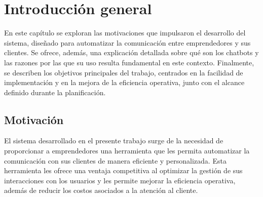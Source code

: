 
\chapter{Introducción general} %

\label{Chapter1} %
\label{IntroGeneral}



\newcommand{\keyword}[1]{\textbf{#1}}
\newcommand{\tabhead}[1]{\textbf{#1}}
\newcommand{\code}[1]{\texttt{#1}}
\newcommand{\file}[1]{\texttt{\bfseries#1}}
\newcommand{\option}[1]{\texttt{\itshape#1}}
\newcommand{\grados}{$^{\circ}$}



En este capítulo se exploran las motivaciones que impulsaron el desarrollo del sistema, diseñado para automatizar la comunicación entre emprendedores y sus clientes. Se ofrece, además, una explicación detallada sobre qué son los chatbots y las razones por las que su uso resulta fundamental en este contexto. Finalmente, se describen los objetivos principales del trabajo, centrados en la facilidad de implementación y en la mejora de la eficiencia operativa, junto con el alcance definido durante la planificación.

\section{Motivación{}}

El sistema desarrollado en el presente trabajo surge de la necesidad de proporcionar a emprendedores una herramienta que les permita automatizar la comunicación con sus clientes de manera eficiente y personalizada. Esta herramienta les ofrece una ventaja competitiva al optimizar la gestión de sus interacciones con los usuarios y les permite mejorar la eficiencia operativa, además de reducir los costos asociados a la atención al cliente.


